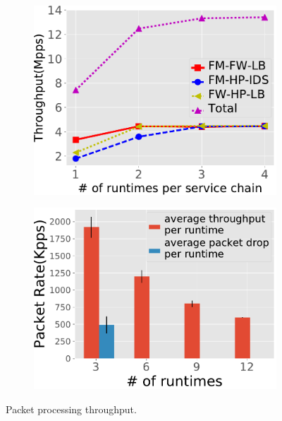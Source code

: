 \begin{figure}[!t]
 \begin{subfigure}[t]{0.49\linewidth}
   \centering
   \includegraphics[width=\columnwidth]{figure/revised-throughput-test.pdf}
   \caption{}\label{fig:normal-case-eval} \end{subfigure}\hfill
  \begin{subfigure}[t]{0.49\linewidth}
   \centering
   \includegraphics[width=\columnwidth]{figure/Mixtest.pdf}
   \caption{}\label{fig:mix-work-flow}
  \end{subfigure}
\caption{ Packet processing throughput.} %
\label{fig:mig-perf}
\end{figure}



